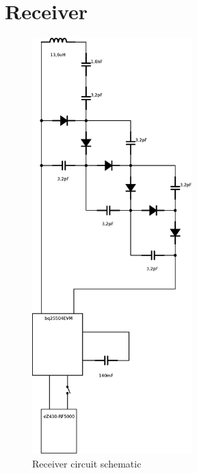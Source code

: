 \section{Receiver}
\begin{figure}[H]
\begin{center}
\includegraphics[width=0.55\textwidth]{./images/ReceiverSchematic}
\caption{Receiver circuit schematic}
\end{center}
\end{figure}


